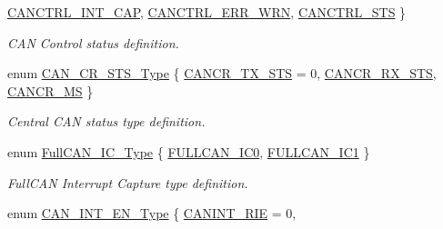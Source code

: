 \begin{DoxyCompactItemize}
\hyperlink{group___c_a_n___public___types_ggafd4d389b789aeffd24d3d164d45026cfaac65893b60a9602fff6c8d430d8b055a}{\-C\-A\-N\-C\-T\-R\-L\-\_\-\-I\-N\-T\-\_\-\-C\-A\-P}, 
\hyperlink{group___c_a_n___public___types_ggafd4d389b789aeffd24d3d164d45026cfa70007b9e6b5ccabf8cade30fce42f86e}{\-C\-A\-N\-C\-T\-R\-L\-\_\-\-E\-R\-R\-\_\-\-W\-R\-N}, 
\hyperlink{group___c_a_n___public___types_ggafd4d389b789aeffd24d3d164d45026cfaf55776c5a411a31b81fec7939767e666}{\-C\-A\-N\-C\-T\-R\-L\-\_\-\-S\-T\-S}
 \}
\begin{DoxyCompactList}\small\item\em \-C\-A\-N \-Control status definition. \end{DoxyCompactList}\item 
enum \hyperlink{group___c_a_n___public___types_ga6166c9b3eacd341555c3cf4ca8bb7ce4}{\-C\-A\-N\-\_\-\-C\-R\-\_\-\-S\-T\-S\-\_\-\-Type} \{ \hyperlink{group___c_a_n___public___types_gga6166c9b3eacd341555c3cf4ca8bb7ce4a0bf9fa2d4e6b57f4a01aed642b859cd3}{\-C\-A\-N\-C\-R\-\_\-\-T\-X\-\_\-\-S\-T\-S} =  0, 
\hyperlink{group___c_a_n___public___types_gga6166c9b3eacd341555c3cf4ca8bb7ce4ab01d1e409ad8dbfbb2fc1f526dda579e}{\-C\-A\-N\-C\-R\-\_\-\-R\-X\-\_\-\-S\-T\-S}, 
\hyperlink{group___c_a_n___public___types_gga6166c9b3eacd341555c3cf4ca8bb7ce4a5161ee95868fef9c9ed7f36a8caa9a76}{\-C\-A\-N\-C\-R\-\_\-\-M\-S}
 \}
\begin{DoxyCompactList}\small\item\em \-Central \-C\-A\-N status type definition. \end{DoxyCompactList}\item 
enum \hyperlink{group___c_a_n___public___types_ga68eb30e4e497ea667c93702fd807e994}{\-Full\-C\-A\-N\-\_\-\-I\-C\-\_\-\-Type} \{ \hyperlink{group___c_a_n___public___types_gga68eb30e4e497ea667c93702fd807e994ac4a0c1b8842dedf1bc5c897c24a59da3}{\-F\-U\-L\-L\-C\-A\-N\-\_\-\-I\-C0}, 
\hyperlink{group___c_a_n___public___types_gga68eb30e4e497ea667c93702fd807e994a31162942d1304b5455cda1a0419ddf5b}{\-F\-U\-L\-L\-C\-A\-N\-\_\-\-I\-C1}
 \}
\begin{DoxyCompactList}\small\item\em \-Full\-C\-A\-N \-Interrupt \-Capture type definition. \end{DoxyCompactList}\item 
enum \hyperlink{group___c_a_n___public___types_gac1a14bd07dce4fe9df7c9d30f0449df0}{\-C\-A\-N\-\_\-\-I\-N\-T\-\_\-\-E\-N\-\_\-\-Type} \{ \*
\hyperlink{group___c_a_n___public___types_ggac1a14bd07dce4fe9df7c9d30f0449df0a56a98b6bbd5f71553cc0fc1c49422dd4}{\-C\-A\-N\-I\-N\-T\-\_\-\-R\-I\-E} =  0, 

\end{DoxyCompactItemize}
